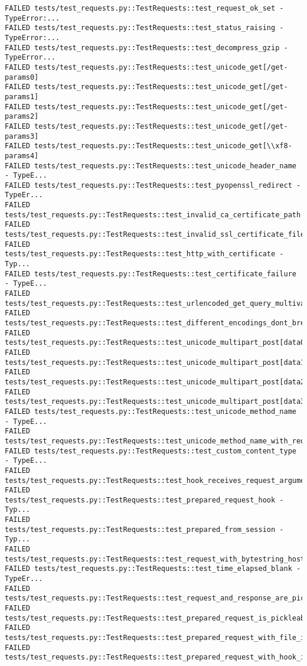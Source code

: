 \begin{Verbatim}[fontsize=\small, breaklines=true, breakanywhere=true]
FAILED tests/test_requests.py::TestRequests::test_request_ok_set - TypeError:...
FAILED tests/test_requests.py::TestRequests::test_status_raising - TypeError:...
FAILED tests/test_requests.py::TestRequests::test_decompress_gzip - TypeError...
FAILED tests/test_requests.py::TestRequests::test_unicode_get[/get-params0]
FAILED tests/test_requests.py::TestRequests::test_unicode_get[/get-params1]
FAILED tests/test_requests.py::TestRequests::test_unicode_get[/get-params2]
FAILED tests/test_requests.py::TestRequests::test_unicode_get[/get-params3]
FAILED tests/test_requests.py::TestRequests::test_unicode_get[\\xf8-params4]
FAILED tests/test_requests.py::TestRequests::test_unicode_header_name - TypeE...
FAILED tests/test_requests.py::TestRequests::test_pyopenssl_redirect - TypeEr...
FAILED tests/test_requests.py::TestRequests::test_invalid_ca_certificate_path
FAILED tests/test_requests.py::TestRequests::test_invalid_ssl_certificate_files
FAILED tests/test_requests.py::TestRequests::test_http_with_certificate - Typ...
FAILED tests/test_requests.py::TestRequests::test_certificate_failure - TypeE...
FAILED tests/test_requests.py::TestRequests::test_urlencoded_get_query_multivalued_param
FAILED tests/test_requests.py::TestRequests::test_different_encodings_dont_break_post
FAILED tests/test_requests.py::TestRequests::test_unicode_multipart_post[data0]
FAILED tests/test_requests.py::TestRequests::test_unicode_multipart_post[data1]
FAILED tests/test_requests.py::TestRequests::test_unicode_multipart_post[data2]
FAILED tests/test_requests.py::TestRequests::test_unicode_multipart_post[data3]
FAILED tests/test_requests.py::TestRequests::test_unicode_method_name - TypeE...
FAILED tests/test_requests.py::TestRequests::test_unicode_method_name_with_request_object
FAILED tests/test_requests.py::TestRequests::test_custom_content_type - TypeE...
FAILED tests/test_requests.py::TestRequests::test_hook_receives_request_arguments
FAILED tests/test_requests.py::TestRequests::test_prepared_request_hook - Typ...
FAILED tests/test_requests.py::TestRequests::test_prepared_from_session - Typ...
FAILED tests/test_requests.py::TestRequests::test_request_with_bytestring_host
FAILED tests/test_requests.py::TestRequests::test_time_elapsed_blank - TypeEr...
FAILED tests/test_requests.py::TestRequests::test_request_and_response_are_pickleable
FAILED tests/test_requests.py::TestRequests::test_prepared_request_is_pickleable
FAILED tests/test_requests.py::TestRequests::test_prepared_request_with_file_is_pickleable
FAILED tests/test_requests.py::TestRequests::test_prepared_request_with_hook_is_pickleable

\end{Verbatim}
